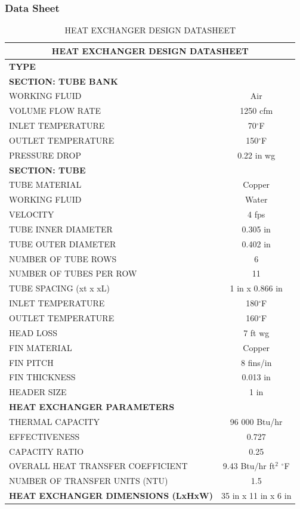 \subsubsection{Data Sheet}
\begin{longtable}[c]{lc}
    \caption{HEAT EXCHANGER DESIGN DATASHEET} \\
    
    \toprule
    \multicolumn{2}{c}{\textbf{HEAT EXCHANGER DESIGN DATASHEET}} \\
    \midrule
    \textbf{TYPE} &  \\
    \midrule
    \textbf{SECTION: TUBE BANK} &  \\
    \midrule
    WORKING FLUID &  Air\\
    VOLUME FLOW RATE &  1250 cfm \\
    INLET TEMPERATURE &  70$^\circ$F\\
    OUTLET TEMPERATURE &  150$^\circ$F\\
    PRESSURE DROP &  0.22 in wg \\
    \midrule
    \textbf{SECTION: TUBE} &  \\
    \midrule
    TUBE MATERIAL &  Copper \\
    WORKING FLUID &  Water \\
    VELOCITY &  4 fps \\
    TUBE INNER DIAMETER &  0.305 in \\
    TUBE OUTER DIAMETER &  0.402 in \\
    NUMBER OF TUBE ROWS &  6 \\
    NUMBER OF TUBES PER ROW &  11 \\
    TUBE SPACING (xt x xL) &  1 in x 0.866 in \\
    INLET TEMPERATURE &  180$^\circ$F\\
    OUTLET TEMPERATURE &  160$^\circ$F\\
    HEAD LOSS &  7 ft wg \\
    FIN MATERIAL &  Copper \\
    FIN PITCH &  8 fins/in \\
    FIN THICKNESS &  0.013 in \\
    HEADER SIZE &  1 in \\
    \midrule
    \textbf{HEAT EXCHANGER PARAMETERS} &  \\
    \midrule
    THERMAL CAPACITY &  96 000 Btu/hr \\
    EFFECTIVENESS &  0.727 \\
    CAPACITY RATIO &  0.25 \\
    OVERALL HEAT TRANSFER COEFFICIENT &  9.43 Btu/hr ft$^2$ $^\circ$F \\
    NUMBER OF TRANSFER UNITS (NTU) &  1.5 \\
    \textbf{HEAT EXCHANGER DIMENSIONS (LxHxW)} &  35 in x 11 in x 6 in \\
    \bottomrule
    \end{longtable}
